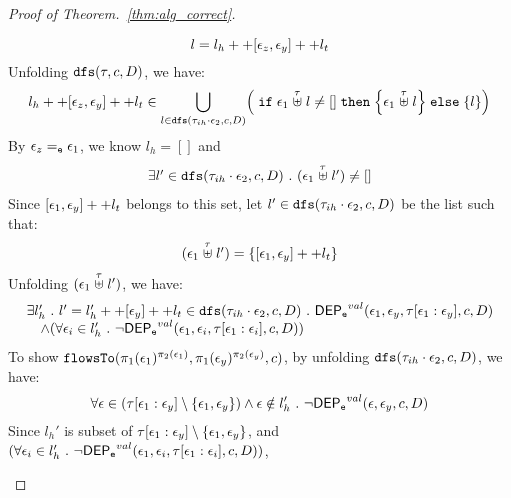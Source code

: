 \begin{proof}[Proof of Theorem.~\ref{thm:alg_correct}]
\begin{case}
\begin{subcase}
\begin{subsubcase}
\[  l = l_h ++ [\mathtt{\epsilon}_z, \mathtt{\epsilon}_y] ++ l_t 
\]
%
Unfolding $\mathtt{dfs}(\mathtt{\tau}, c, D)$, we have:
%
\[
  l_h ++ [\event_z, \event_y] ++ l_t  \in 
     \bigcup\limits_{l \in \kw{dfs}(\trace_{ih} \cdot \event_2, c, D) }
  \left(  \eif \event_1 \stackrel{\trace}{\uplus} l \neq [] 
  \ethen \left\{ \event_1 \stackrel{\trace}{\uplus} l \right\} \eelse \left\{ l \right\}
  \right)
  \]
By $\mathtt{\epsilon}_z =_{\mathtt{e}} \mathtt{\epsilon}_1$, we know $l_h = []$ and 
%
\[
\begin{array}{l}
  \exists l' \in \mathtt{dfs}(\mathtt{\tau}_{ih}\cdot \mathtt{\epsilon}_2, c, D) ~.~
   (\mathtt{\epsilon}_1 \stackrel{\mathtt{\tau}}{\uplus} l') \neq []
\end{array}
\]
%
Since $[\mathtt{\epsilon}_1, \mathtt{\epsilon}_y] ++ l_t $ belongs to this set, let $l' \in \mathtt{dfs}(\mathtt{\tau}_{ih}\cdot \mathtt{\epsilon}_2, c, D)$ be the list such that:
\[
\begin{array}{l}
   (\mathtt{\epsilon}_1 \stackrel{\mathtt{\tau}}{\uplus} l') = \{[\mathtt{\epsilon}_1, \mathtt{\epsilon}_y] ++ l_t\}
\end{array}
\]
%
Unfolding $(\mathtt{\epsilon}_1 \stackrel{\mathtt{\tau}}{\uplus} l') $, we have:
\[
\begin{array}{l}
  \exists l_{h}' ~.~ l' = l_{h}' ++ [\mathtt{\epsilon}_y] ++ l_t \in \mathtt{dfs}(\mathtt{\tau}_{ih}\cdot \mathtt{\epsilon}_2, c, D) ~.~
  \mathsf{DEP_{\mathtt{e}}}^{val}(\mathtt{\epsilon}_1, \mathtt{\epsilon}_y, \mathtt{\tau}[\mathtt{\epsilon}_1:\mathtt{\epsilon}_y], c, D)
  \\ \quad \land 
  (\forall \mathtt{\epsilon}_i \in l_{h}' ~.~ \neg \mathsf{DEP_{\mathtt{e}}}^{val} (\mathtt{\epsilon}_1, \mathtt{\epsilon}_i, \mathtt{\tau}[\mathtt{\epsilon}_1: \mathtt{\epsilon}_i], c, D))
\end{array}
\]
%
%
To show $\mathtt{flowsTo}(\pi_1(\mathtt{\epsilon}_1)^{\pi_2(\mathtt{\epsilon}_1)}, \pi_1(\mathtt{\epsilon}_y)^{\pi_2(\mathtt{\epsilon}_y)}, c)$, 
%
by unfolding $\mathtt{dfs}(\mathtt{\tau}_{ih}\cdot \mathtt{\epsilon}_2, c, D) $, we have:
\[
  \forall \mathtt{\epsilon} \in (\mathtt{\tau}[\mathtt{\epsilon}_1:\mathtt{\epsilon}_y]\setminus \{\mathtt{\epsilon}_1, \mathtt{\epsilon}_y\}) 
 \land \mathtt{\epsilon} \notin l_h' 
 ~.~ 
 \neg \mathsf{DEP_{\mathtt{e}}}^{val} (\mathtt{\epsilon}, \mathtt{\epsilon}_y, c, D)
\]
%
Since $l_{h}'$ is subset of $\mathtt{\tau}[\mathtt{\epsilon}_1:\mathtt{\epsilon}_y] \setminus \{\mathtt{\epsilon}_1, \mathtt{\epsilon}_y\}$, and $(\forall \mathtt{\epsilon}_i \in l_{h}' ~.~ \neg \mathsf{DEP_{\mathtt{e}}}^{val} (\mathtt{\epsilon}_1, \mathtt{\epsilon}_i, \mathtt{\tau}[\mathtt{\epsilon}_1: \mathtt{\epsilon}_i], c, D))$,

\end{subsubcase}
\end{subcase}
\end{case}
\end{proof}
